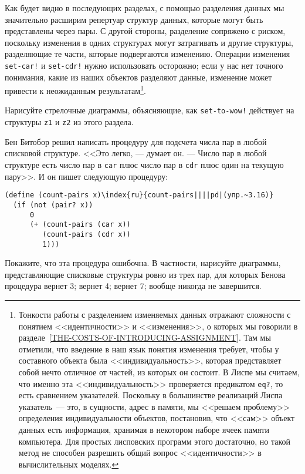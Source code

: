 Как будет видно в последующих разделах, с помощью
разделения данных мы значительно расширим репертуар структур данных,
которые могут быть представлены через пары.  С другой стороны,
разделение сопряжено с риском, поскольку изменения в одних
структурах могут затрагивать и другие структуры, разделяющие те части,
которые подвергаются изменению.  Операции изменения
{\tt set-car!} и {\tt set-cdr!} нужно использовать
осторожно; если у нас нет точного понимания, какие из наших объектов
разделяют данные, изменение может привести к неожиданным
результатам\footnote{Тонкости работы с разделением изменяемых данных
отражают сложности с понятием <<идентичности>> и <<изменения>>, о
которых мы говорили в
разделе~\ref{THE-COSTS-OF-INTRODUCING-ASSIGNMENT}.  Там мы
отметили, что введение в наш язык понятия изменения требует,
чтобы у составного объекта была <<индивидуальность>>, которая
представляет собой нечто отличное от частей, из которых он состоит.  В
Лиспе мы считаем, что именно эта <<индивидуальность>> проверяется
предикатом {\tt eq?}, то есть сравнением указателей.  Поскольку
в большинстве реализаций Лиспа указатель~--- это, в сущности, адрес в
памяти, мы <<решаем проблему>> определения индивидуальности объектов,
постановив, что <<сам>> объект данных есть информация, хранимая в
некотором наборе ячеек памяти компьютера.  Для простых лисповских программ
этого достаточно, но такой метод не способен разрешить общий вопрос
<<идентичности>> в вычислительных моделях.
}.
\begin{exercise}{3.15}\label{EX3.15}%
Нарисуйте стрелочные диаграммы, объясняющие, как
{\tt set-to-wow!} действует на структуры {\tt z1} и
{\tt z2} из этого раздела.
\end{exercise}
\begin{exercise}{3.16}\label{EX3.16}%
Бен Битобор решил написать процедуру для подсчета
числа пар в любой списковой структуре. <<Это легко, --- думает он.
--- Число пар в любой структуре есть число пар в {\tt car} плюс
число пар в {\tt cdr} плюс один на текущую пару>>. И  он
пишет следующую процедуру:

\begin{Verbatim}[fontsize=\small]
(define (count-pairs x)\index{ru}{count-pairs||||pd|(упр.~3.16)}
  (if (not (pair? x))
      0
      (+ (count-pairs (car x))
         (count-pairs (cdr x))
         1)))
\end{Verbatim}
Покажите, что эта процедура ошибочна.  В частности, нарисуйте
диаграммы, представляющие списковые структуры
ровно из трех пар, для которых Бенова процедура вернет 3; вернет 4;
вернет 7; вообще никогда не завершится.
\end{exercise}
